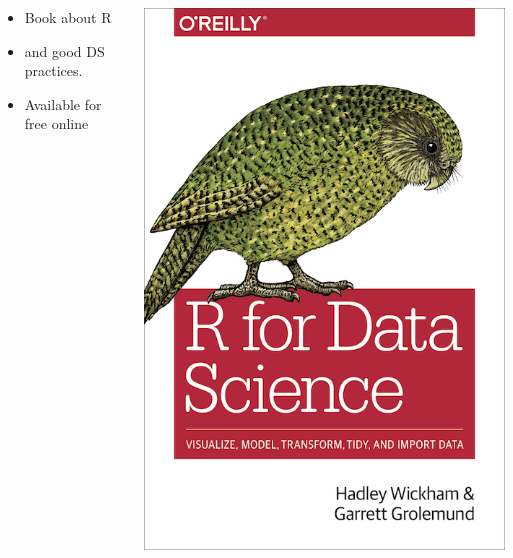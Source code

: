 \documentclass[12pt]{beamer}\usepackage[]{graphicx}\usepackage[]{color}
\begin{document}
\begin{frame}
\begin{columns}[T] %
\begin{column}{.48\textwidth}
\vspace{2cm}
 \begin{itemize}
  \item Book about R
  \item and good DS practices.
  \item Available for free online
 \end{itemize}
\end{column}%
\hfill%
\begin{column}{.48\textwidth}

 \includegraphics[width=\textwidth,height=\textheight,keepaspectratio]{./Images/02_rBook}
\end{column}%
\end{columns}
\end{frame}
\end{document}
